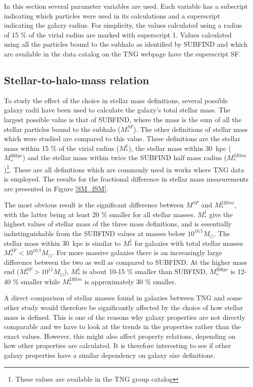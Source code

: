 In this section several parameter variables are used. Each variable has a subscript indicating which particles were used in its calculations and a superscript indicating the galaxy radius. For simplicity, the values calculated using a radius of 15 \% of the virial radius are marked with superscript 1. Values calculated using all the particles bound to the subhalo as identified by SUBFIND and which are available in the data catalog on the TNG webpage have the superscript SF.

\subsection{Stellar-to-halo-mass relation}

To study the effect of the choice in stellar mass definitions, several possible galaxy radii have been used to calculate the galaxy's total stellar mass. The largest possible value is that of SUBFIND, where the mass is the sum of all the stellar particles bound to the subhalo ($M^{SF}_\ast$). The other definitions of stellar mass which were studied are compared to this value. These definitions are the stellar mass within 15 \% of the virial radius ($M_\ast^1$), the stellar mass within 30$\,$ kpc ($M_\ast^{30kpc}$) and the stellar mass within twice the SUBFIND half mass radius ($M_\ast^{2Rhm}$)\footnote{These values are available in the TNG group catalog}. These are all definitions which are commonly used in works where TNG data is employed. The results for the fractional difference in stellar mass measurements are presented in Figure \ref{SM_fSM}.

The most obvious result is the significant difference between $M^{SF}$ and $M_\ast^{2Rhm}$, with the latter being at least 20 \% smaller for all stellar masses. $M_\ast^1$ give the highest values of stellar mass of the three mass definitions, and is essentially indistinguishable from the SUBFIND values at masses below $10^{10.5} M_{\odot}$. The stellar mass within 30$\,$ kpc is similar to $M^1_\ast$ for galaxies with total stellar masses $M^{SF}_\ast < 10^{10.7} M_{\odot}$. For more massive galaxies there is an increasingly large difference between the two as well as compared to SUBFIND. At the higher mass end ($M^{SF}_\ast > 10^{11} M_{\odot}$), $M^1_\ast$ is about 10-15 \% smaller than SUBFIND, $M_\ast^{30kpc}$ is 12-40 \% smaller while $M_\ast^{2Rhm}$ is approximately 30 \% smaller. 


A direct comparison of stellar masses found in galaxies between TNG and some other study would therefore be significantly affected by the choice of how stellar mass is defined. This is one of the reasons why galaxy properties are not directly comparable and we have to look at the trends in the properties rather than the exact values. However, this might also affect property relations, depending on how other properties are calculated. It is therefore interesting to see if other galaxy properties have a similar dependency on galaxy size definitions.

